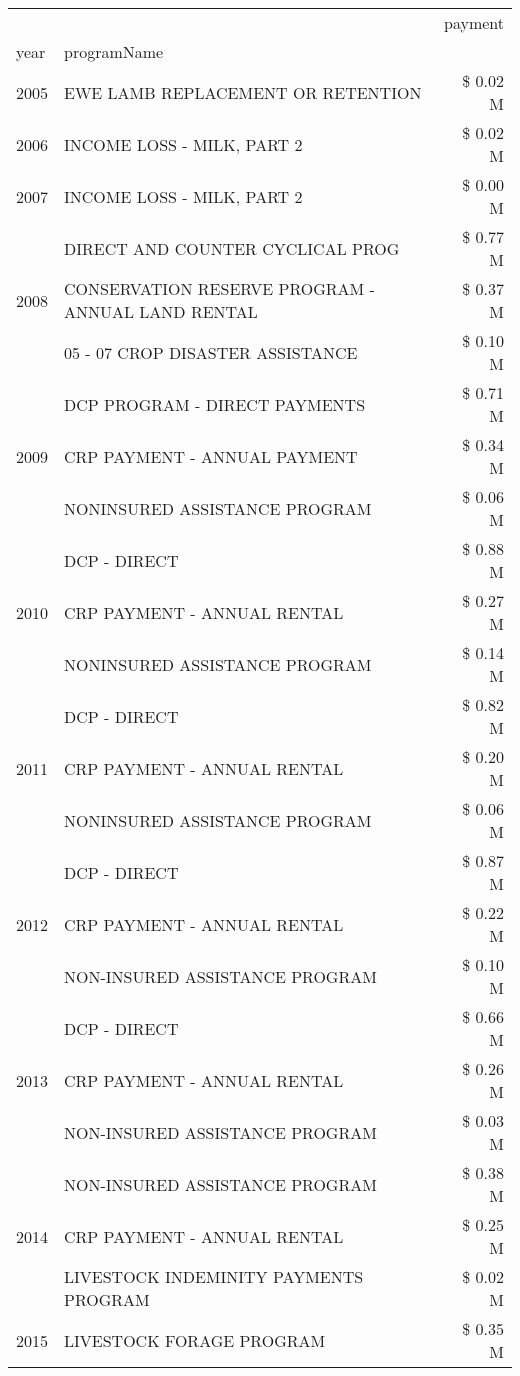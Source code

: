 \begin{tabular}{llr}
\toprule
 &  & payment \\
year & programName &  \\
\midrule
2005 & EWE LAMB REPLACEMENT OR RETENTION & \$ 0.02 M \\
\cline{1-3}
2006 & INCOME LOSS - MILK, PART 2 & \$ 0.02 M \\
\cline{1-3}
2007 & INCOME LOSS - MILK, PART 2 & \$ 0.00 M \\
\cline{1-3}
\multirow[t]{3}{*}{2008} & DIRECT AND COUNTER CYCLICAL PROG & \$ 0.77 M \\
 & CONSERVATION RESERVE PROGRAM - ANNUAL LAND RENTAL & \$ 0.37 M \\
 & 05 - 07 CROP DISASTER ASSISTANCE & \$ 0.10 M \\
\cline{1-3}
\multirow[t]{3}{*}{2009} & DCP PROGRAM - DIRECT PAYMENTS & \$ 0.71 M \\
 & CRP PAYMENT - ANNUAL PAYMENT & \$ 0.34 M \\
 & NONINSURED ASSISTANCE PROGRAM & \$ 0.06 M \\
\cline{1-3}
\multirow[t]{3}{*}{2010} & DCP - DIRECT & \$ 0.88 M \\
 & CRP PAYMENT - ANNUAL RENTAL & \$ 0.27 M \\
 & NONINSURED ASSISTANCE PROGRAM & \$ 0.14 M \\
\cline{1-3}
\multirow[t]{3}{*}{2011} & DCP - DIRECT & \$ 0.82 M \\
 & CRP PAYMENT - ANNUAL RENTAL & \$ 0.20 M \\
 & NONINSURED ASSISTANCE PROGRAM & \$ 0.06 M \\
\cline{1-3}
\multirow[t]{3}{*}{2012} & DCP - DIRECT & \$ 0.87 M \\
 & CRP PAYMENT - ANNUAL RENTAL & \$ 0.22 M \\
 & NON-INSURED ASSISTANCE PROGRAM & \$ 0.10 M \\
\cline{1-3}
\multirow[t]{3}{*}{2013} & DCP - DIRECT & \$ 0.66 M \\
 & CRP PAYMENT - ANNUAL RENTAL & \$ 0.26 M \\
 & NON-INSURED ASSISTANCE PROGRAM & \$ 0.03 M \\
\cline{1-3}
\multirow[t]{3}{*}{2014} & NON-INSURED ASSISTANCE PROGRAM & \$ 0.38 M \\
 & CRP PAYMENT - ANNUAL RENTAL & \$ 0.25 M \\
 & LIVESTOCK INDEMINITY PAYMENTS PROGRAM & \$ 0.02 M \\
\cline{1-3}
\multirow[t]{3}{*}{2015} & LIVESTOCK FORAGE PROGRAM & \$ 0.35 M \\

\end{tabular}
